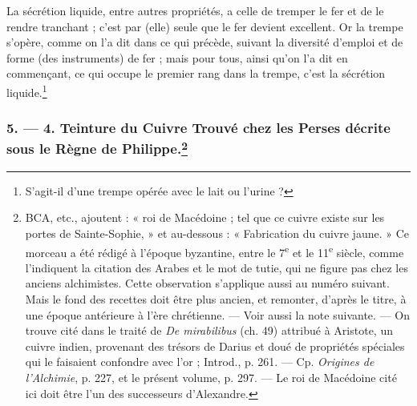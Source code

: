 \documentclass[a4paper, 11pt, oneside, polutonikogreek, french]{article}
\begin{document}
La sécrétion liquide, entre autres propriétés, a celle de tremper le fer et de le rendre tranchant ; c'est par (elle) seule que le fer devient excellent. Or la trempe s'opère, comme on l'a dit dans ce qui précède, suivant la diversité d'emploi et de forme (des instruments) de fer ; mais pour tous, ainsi qu'on l'a dit en commençant, ce qui occupe le premier rang dans la trempe, c'est la sécrétion liquide.\footnote{S'agit-il d'une trempe opérée avec le lait ou l'urine ?}

\bigskip
\centerline{\EightStarTaper}
\centerline{\EightStarTaper\EightStarTaper}
\bigskip

\subsubsection[5. --- 4. Teinture du Cuivre Trouvé chez les Perses décrite sous le Règne de Philippe.]{5. --- 4. Teinture du Cuivre Trouvé chez les Perses décrite sous le Règne de Philippe.\footnote{BCA, etc., ajoutent : « roi de Macédoine ; tel que ce cuivre existe sur les portes de Sainte-Sophie, » et au-dessous : « Fabrication du cuivre jaune. » Ce morceau a été rédigé à l'époque byzantine, entre le 7\textsuperscript{e} et le 11\textsuperscript{e} siècle, comme l'indiquent la citation des Arabes et le mot de tutie, qui ne figure pas chez les anciens alchimistes. Cette observation s'applique aussi au numéro suivant. Mais le fond des recettes doit être plus ancien, et remonter, d'après le titre, à une époque antérieure à l'ère chrétienne. --- Voir aussi la note suivante. --- On trouve cité dans le traité de \emph{De mirabilibus} (ch. 49) attribué à Aristote, un cuivre indien, provenant des trésors de Darius et doué de propriétés spéciales qui le faisaient confondre avec l'or ; Introd., p. 261. --- Cp. \emph{Origines de l'Alchimie}, p. 227, et le présent volume, p. 297. --- Le roi de Macédoine cité ici doit être l'un des successeurs d'Alexandre.}}
\end{document}
